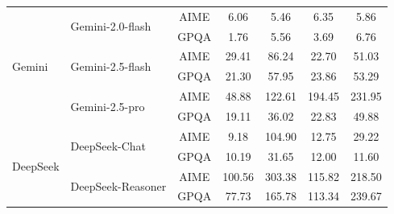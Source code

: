 \documentclass[letterpaper,twocolumn,10pt]{article}
\begin{document}
\begin{table}[t!]
{\begin{tabular}{llccccc}
\multirow{6}{*}{Gemini} 
& \multirow{2}{*}{Gemini-2.0-flash} 
  & AIME & 6.06 & \cellcolor{mygreen}5.46 & \cellcolor{mygreen}6.35 & \cellcolor{mygreen}5.86 \\
& & GPQA & 1.76 & \cellcolor{myred!20}5.56 & \cellcolor{myred!20}3.69 & \cellcolor{myred!20}6.76 \\
\cmidrule{2-7}

& \multirow{2}{*}{Gemini-2.5-flash} 
  & AIME & 29.41 & \cellcolor{myred!20}86.24 & \cellcolor{myblue!20}22.70 & \cellcolor{myred!20}51.03 \\
& & GPQA & 21.30 & \cellcolor{myred!20}57.95 & \cellcolor{mygreen}23.86 & \cellcolor{myred!20}53.29 \\
\cmidrule{2-7}

& \multirow{2}{*}{Gemini-2.5-pro} 
  & AIME & 48.88 & \cellcolor{myred!20}122.61 & \cellcolor{myred!20}194.45 & \cellcolor{myred!20}231.95 \\
& & GPQA & 19.11 & \cellcolor{myred!20}36.02 & \cellcolor{mygreen}22.83 & \cellcolor{myred!20}49.88 \\
\midrule

\multirow{4}{*}{DeepSeek} 
& \multirow{2}{*}{DeepSeek-Chat} 
  & AIME & 9.18 & \cellcolor{myred!20}104.90 & \cellcolor{myred!20}12.75 & \cellcolor{myred!20}29.22 \\
& & GPQA & 10.19 & \cellcolor{myred!20}31.65 & \cellcolor{mygreen}12.00 & \cellcolor{mygreen}11.60 \\
\cmidrule{2-7}

& \multirow{2}{*}{DeepSeek-Reasoner} 
  & AIME & 100.56 & \cellcolor{myred!20}303.38 & \cellcolor{mygreen}115.82 & \cellcolor{myred!20}218.50 \\
& & GPQA & 77.73 & \cellcolor{myred!20}165.78 & \cellcolor{myred!20}113.34 & \cellcolor{myred!20}239.67 \\

\bottomrule
\end{tabular}
}
\end{table}
\end{document}
